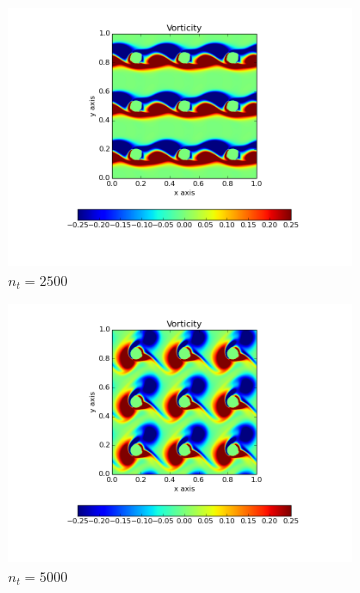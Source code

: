 \documentclass[10pt, a4paper]{article}
\begin{document}
\begin{figure}[htb!]
\centering
\begin{subfigure}{.5\textwidth}
  \centering
  \includegraphics[width=1.1\linewidth, clip=true, trim=1cm 1cm 1cm 1cm]{q3_0001}
  \caption{$n_t = 2500$}
  \label{fig:sub1}
\end{subfigure}%
\begin{subfigure}{.5\textwidth}
  \centering
  \includegraphics[width=1.1\linewidth, clip=true, trim=1cm 1cm 1cm 1cm]{q3_0002}
  \caption{$n_t = 5000$}
  \label{fig:sub2}
\end{subfigure}
\newline
\begin{subfigure}{.5\textwidth}
  \centering

\end{subfigure}
\end{figure}
\end{document}
